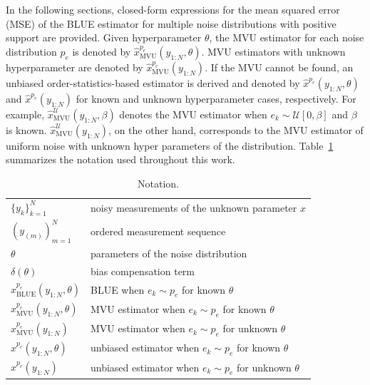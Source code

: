 \documentclass{article}
\begin{document}
In the following sections, closed-form expressions for the mean squared error (MSE) of the BLUE estimator for multiple noise distributions with positive support are provided.  Given  hyperparameter $\theta$, the MVU estimator for each noise distribution $p_e$ is denoted by $\hat{x}_{\mathrm{MVU}}^{p_e}(y_{1:N},\theta)$. MVU estimators with unknown hyperparameter are denoted by  $\hat{x}_{\mathrm{MVU}}^{p_e}(y_{1:N})$. If the MVU cannot be found, an unbiased order-statistics-based estimator is derived and denoted by $\hat{x}^{p_e}(y_{1:N},\theta)$ and $\hat{x}^{p_e}(y_{1:N})$ for known and unknown hyperparameter cases, respectively. For example, $\hat{x}^{\mathcal{U}}_{\mathrm{MVU}}(y_{1:N},\beta)$ denotes the MVU estimator when $e_k\sim\mathcal{U}[0,\beta]$ and $\beta$  is known. $\hat{x}^{\mathcal{U}}_{\mathrm{MVU}}(y_{1:N})$, on the other hand, corresponds to the MVU estimator of uniform noise with unknown hyper parameters of the distribution. Table~\ref{tbl:notation} summarizes the notation used throughout this work.
\begin{table}[]
	\centering
	\caption{Notation.}
	\begin{tabular}{l|l}
		$\{y_k\}_{k=1}^N$                                                & noisy measurements of the unknown parameter $x$                                                          \\[2mm]
		$\left(y_{(m)}\right)_{m=1}^N$                                            & ordered measurement sequence                                          \\[2mm]
		$\theta$                                        & parameters of the noise distribution                                                                     \\[2mm]
		$\delta(\theta)$                                & bias compensation term                                                                                   \\[2mm]
		$\hat{x}^{p_e}_{\mathrm{BLUE}}(y_{1:N},\theta)$ & BLUE when $e_k\sim p_e$ for known $\theta$                                            \\[2mm]
		$\hat{x}^{p_e}_{\mathrm{MVU}}(y_{1:N},\theta)$  & MVU estimator when $e_k\sim p_e$ for known $\theta$                                   \\[2mm]
		$\hat{x}^{p_e}_{\mathrm{MVU}}(y_{1:N})$              & MVU estimator when $e_k\sim p_e$ for unknown $\theta$ \\[2mm]
		$\hat{x}^{p_e}(y_{1:N},\theta)$                 & unbiased estimator when $e_k\sim p_e$ for known $\theta$                              \\[2mm]
		$\hat{x}^{p_e}(y_{1:N})$                             & unbiased estimator when $e_k\sim p_e$ for unknown $\theta$                           
	\end{tabular}
	\label{tbl:notation}
\end{table}
\end{document}
